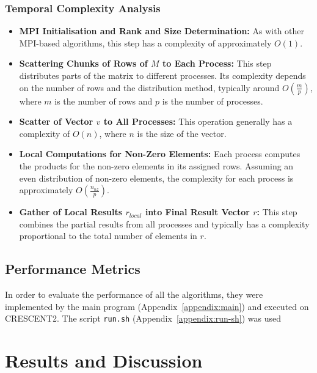 \documentclass[12pt,oneside]{book} %
\begin{document}
\subsection{Temporal Complexity Analysis}

\begin{itemize}
    \item \textbf{MPI Initialisation and Rank and Size Determination:} As with other MPI-based algorithms, this step has a complexity of approximately \( O(1) \).

    \item \textbf{Scattering Chunks of Rows of \( M \) to Each Process:} This step distributes parts of the matrix to different processes. Its complexity depends on the number of rows and the distribution method, typically around \( O(\frac{m}{p}) \), where \( m \) is the number of rows and \( p \) is the number of processes.

    \item \textbf{Scatter of Vector \( v \) to All Processes:} This operation generally has a complexity of \( O(n) \), where \( n \) is the size of the vector.

    \item \textbf{Local Computations for Non-Zero Elements:} Each process computes the products for the non-zero elements in its assigned rows. Assuming an even distribution of non-zero elements, the complexity for each process is approximately \( O(\frac{n_{nz}}{p}) \).

    \item \textbf{Gather of Local Results \( r_{local} \) into Final Result Vector \( r \):} This step combines the partial results from all processes and typically has a complexity proportional to the total number of elements in \( r \).
\end{itemize}

\section{Performance Metrics}
In order to evaluate the performance of all the algorithms, they were
implemented by the main program (Appendix~\ref{appendix:main}) and executed on
CRESCENT2. The script \texttt{run.sh} (Appendix~\ref{appendix:run-sh}) was used

\newpage

\chapter{Results and Discussion}
\end{document}
